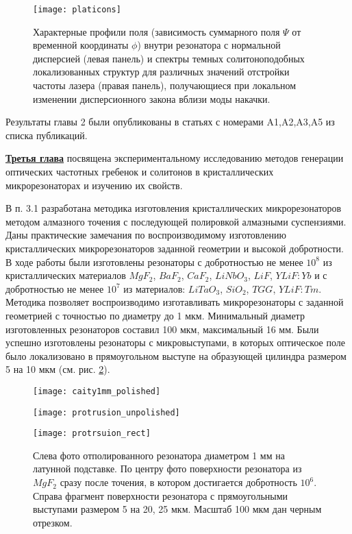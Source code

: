 \begin{figure}[!htb]
  \centering
  \texttt{[image: platicons]}
  \caption{Характерные профили поля (зависимость суммарного поля $\Psi$ от временной координаты $\phi$) внутри резонатора с нормальной дисперсией (левая панель) и спектры темных солитоноподобных локализованных структур для различных значений отстройки частоты лазера (правая панель), получающиеся при локальном изменении дисперсионного закона вблизи моды накачки.}
  \label{platicons}
\end{figure}

Результаты главы 2 были опубликованы в статьях с номерами A1,A2,A3,A5 из списка публикаций.

\underline{\textbf{Третья глава}} посвящена экспериментальному исследованию методов генерации оптических частотных гребенок и солитонов в кристаллических микрорезонаторах и изучению их свойств.

В п. 3.1 разработана методика изготовления кристаллических микрорезонаторов методом алмазного точения с последующей полировкой алмазными суспензиями. Даны практические замечания по воспроизводимому изготовлению кристаллических микрорезонаторов заданной геометрии и высокой добротности. В ходе работы были изготовлены резонаторы с добротностью не менее $10^8$ из кристаллических материалов $MgF_2$, $BaF_2$, $CaF_2$, $LiNbO_3$, $LiF$, $YLiF:Yb$ и с добротностью не менее $10^7$ из материалов: $LiTaO_3$, $SiO_2$, $TGG$, $YLiF:Tm$. Методика позволяет воспроизводимо изготавливать микрорезонаторы с заданной геометрией с точностью по диаметру до 1 мкм. Минимальный диаметр изготовленных резонаторов составил 100 мкм, максимальный 16 мм. Были успешно изготовлены резонаторы с микровыступами, в которых оптическое поле было локализовано в прямоугольном выступе на образующей цилиндра размером 5 на 10 мкм (см. рис. \ref{cavity_polished}).

\begin{figure}[!htb]
  \begin{minipage}{0.32\linewidth}\centering
    \texttt{[image: caity1mm\_polished]}
  \end{minipage}
  \hfill
  \begin{minipage}{0.32\linewidth}\centering
    \texttt{[image: protrusion\_unpolished]}
  \end{minipage}
  \hfill
  \begin{minipage}{0.32\linewidth}\centering
    \texttt{[image: protrsuion\_rect]}
  \end{minipage}
  \caption{Слева фото отполированного резонатора диаметром 1 мм на латунной подставке. По центру фото поверхности резонатора из $MgF_2$ сразу после точения, в котором достигается добротность $10^6$. Справа фрагмент поверхности резонатора с прямоугольными выступами размером 5 на 20, 25 мкм. Масштаб 100 мкм дан черным отрезком.}
  \label{cavity_polished}
\end{figure}

